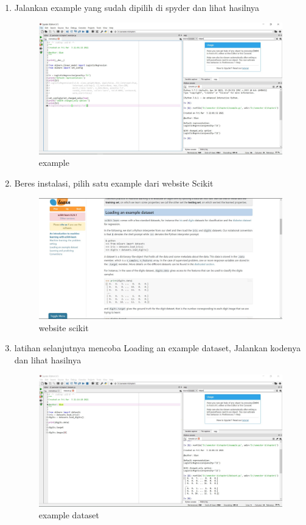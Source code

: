\begin{enumerate}
		\item{Jalankan example yang sudah dipilih di spyder dan lihat hasilnya}
        \begin{figure}[H]
		\centering
		\includegraphics[width=1\textwidth]{figures/1184095/chapter1/5.JPG}
		\caption{example}
		\label{print}
		\end{figure}
		
		\item{Beres instalasi, pilih satu example dari website Scikit}
        \begin{figure}[H]
		\centering
		\includegraphics[width=1\textwidth]{figures/1184095/chapter1/6 awal.JPG}
		\caption{website scikit}
		\label{print}
		\end{figure}
		
		\item{latihan selanjutnya mencoba Loading an example dataset, Jalankan kodenya dan lihat hasilnya}
        \begin{figure}[H]
		\centering
		\includegraphics[width=1\textwidth]{figures/1184095/chapter1/6.JPG}
		\caption{example dataset}
		\label{print}
		\end{figure}
		

\end{enumerate}
